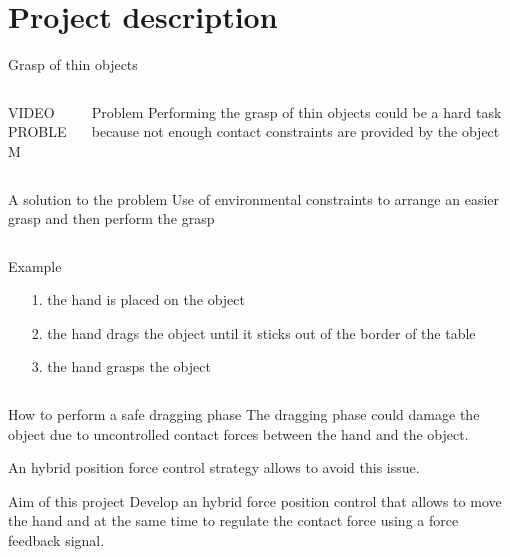 \section{Project description}
\begin{frame}{Grasp of thin objects}
  \begin{columns}
    \begin{column}{0.5\textwidth}
      VIDEO PROBLEM
    \end{column}
    \begin{column}{0.5\textwidth}
      \begin{alertblock}{Problem}
        Performing the grasp of thin objects could be a hard task
        because not enough contact constraints are provided by the object
      \end{alertblock}
    \end{column}
  \end{columns}
\end{frame}

\begin{frame}{A solution to the problem}
  Use of environmental constraints to arrange an easier grasp and
  then perform the grasp
  \begin{columns}
    \begin{column}{0.5\textwidth}
      \begin{exampleblock}{Example}
        \begin{itemize}
        \item[1.] the hand is placed on the object
        \item[2.] the hand drags the object until it \alert{sticks out 
          of the border} of the table 
        \item[3.] the hand grasps the object
        \end{itemize}
      \end{exampleblock}
    \end{column}
  \end{columns}
\end{frame}

\begin{frame}{How to perform a safe dragging phase}
  The dragging phase could \alert{damage} the object due to uncontrolled contact forces between the 
  hand and the object.
  \par
  An hybrid position force control strategy allows to avoid this issue.
  \vskip0.5in
  \begin{exampleblock}{Aim of this project}
    Develop an hybrid force position control that allows to move the hand and 
    at the same time to regulate the contact force using a force feedback signal.
  \end{exampleblock}
\end{frame}
